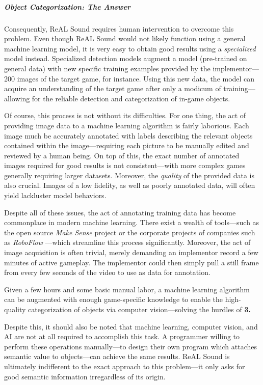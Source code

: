 \documentclass{report}
\newcommand{\rs}{ReAL Sound\xspace}
\begin{document}
\subparagraph{Object Categorization: \emph{The Answer}}
Consequently, \rs requires human intervention to overcome this problem. Even though \rs would not likely function using a general machine learning model, it is very easy to obtain good results using a \emph{specialized} model instead. Specialized detection models augment a model (pre-trained on general data) with new specific training examples provided by the implementor---200 images of the target game, for instance. Using this new data, the model can acquire an understanding of the target game after only a modicum of training---allowing for the reliable detection and categorization of in-game objects.

Of course, this process is not without its difficulties. For one thing, the act of providing image data to a machine learning algorithm is fairly laborious. Each image much be accurately annotated with labels describing the relevant objects contained within the image---requiring each picture to be manually edited and reviewed by a human being. On top of this, the exact number of annotated images required for good results is not consistent---with more complex games generally requiring larger datasets. Moreover, the \emph{quality} of the provided data is also crucial. Images of a low fidelity, as well as poorly annotated data, will often yield lackluster model behaviors.

Despite all of these issues, the act of annotating training data has become commonplace in modern machine learning. There exist a wealth of tools---such as the open source \emph{Make Sense} project \cite{make-sense} or the corporate projects of companies such as \emph{RoboFlow} \cite{Roboflow_Supervision}---which streamline this process significantly. Moreover, the act of image acquisition is often trivial, merely demanding an implementor record a few minutes of active gameplay. The implementor could then simply pull a still frame from every few seconds of the video to use as data for annotation. 

Given a few hours and some basic manual labor, a machine learning algorithm can be augmented with enough game-specific knowledge to enable the high-quality categorization of objects via computer vision---solving the hurdles of \textbf{3.} 

Despite this, it should also be noted that machine learning, computer vision, and AI are not at all required to accomplish this task. A programmer willing to perform these operations manually---to design their own program which attaches semantic value to objects---can achieve the same results. \rs is ultimately indifferent to the exact approach to this problem---it only asks for good semantic information irregardless of its origin.
\end{document}
